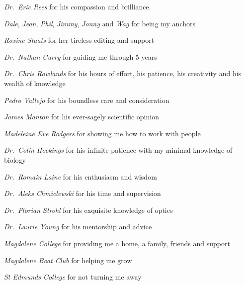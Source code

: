 
\begin{acknowledgements}
  \begin{description}%
    \item \emph{Dr.~Eric Rees} for his compassion and brilliance.
    \item \emph{Dale}, \emph{Jean}, \emph{Phil}, \emph{Jimmy}, \emph{Jonny} and \emph{Wag} for being my anchors
    \item \emph{Roxine Staats} for her tireless editing and support
    \item \emph{Dr.~Nathan Curry} for guiding me through 5 years
    \item \emph{Dr.~Chris Rowlands} for his hours of effort, his patience, his creativity and his wealth of knowledge
    \item \emph{Pedro Vallejo} for his boundless care and consideration
    \item \emph{James Manton} for his ever-sagely scientific opinion
    \item \emph{Madeleine Eve Rodgers} for showing me how to work with people
    \item \emph{Dr.~Colin Hockings} for his infinite patience with my minimal knowledge of biology
    \item \emph{Dr.~Romain Laine} for his enthusiasm and wisdom
    \item \emph{Dr.~Aleks Chmielewski} for his time and supervision
    \item \emph{Dr.~Florian Strohl} for his exquisite knowledge of optics
    \item \emph{Dr.~Laurie Young} for his mentorship and advice
    \item \emph{Magdalene College} for providing me a home, a family, friends and support
    \item \emph{Magdalene Boat Club} for helping me grow
    \item \emph{St Edmunds College} for not turning me away
  \end{description}
\end{acknowledgements}
